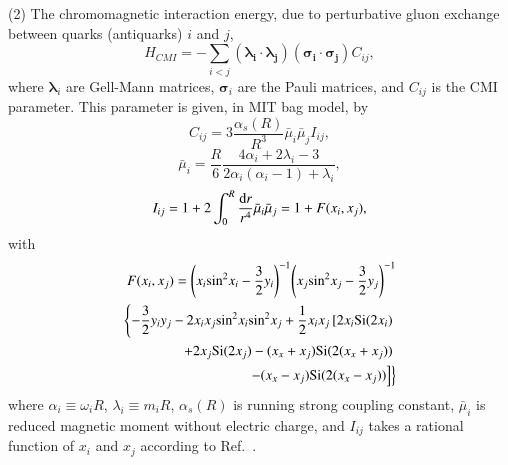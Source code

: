\documentclass[prd,twocolumn,floatfix,nofootinbib]{revtex4}
\begin{document}
(2) The chromomagnetic interaction energy, due to perturbative gluon exchange between quarks (antiquarks) $i$ and $j$,
\begin{equation}\label{CMI}
    H_{CMI}=-\sum_{i<j} \left(\boldsymbol{\lambda_{i}}\cdot \boldsymbol{\lambda_{j}}\right) \left(\boldsymbol{\sigma_{i}}\cdot \boldsymbol{\sigma_{j}}\right)C_{ij},
\end{equation}
where $\boldsymbol{\lambda}_{i}$ are Gell-Mann matrices, $\boldsymbol{\sigma}_{i}$ are the Pauli matrices, and $C_{ij}$ is the CMI parameter. This parameter is given, in MIT bag model, by
\begin{equation}\label{Cij}
    C_{ij}=3\frac{\alpha_{s}\left(R\right)}{R^{3}}\bar{\mu}_{i}\bar{\mu}_{j}I_{ij},
\end{equation}
\begin{equation}\label{muBari}
   \bar{\mu}_{i}=\frac{R}{6} \frac{4\alpha_{i}+2\lambda_{i}-3}{2\alpha_{i}\left(\alpha_{i}-1\right)+\lambda_{i}},
\end{equation}
\begin{equation}\label{Iij}
    I_{ij}=1+2\int_{0}^{R} \frac{{\rm d}r}{r^{4}} \bar{\mu}_{i}\bar{\mu}_{j}=1+F(x_{i}, x_{j}),
\end{equation}
with 
\begin{equation}\label{F}
    \begin{aligned}
        F(x_{i}, x_{j})={\left(x_{i} {\rm sin}^{2}x_{i}-\frac{3}{2}y_{i}\right)}^{-1} {\left(x_{j} {\rm sin^{2}}x_{j}-\frac{3}{2}y_{j}\right)}^{-1} \\ 
        \left\{-\frac{3}{2}y_{i}y_{j}-2x_{i}x_{j} {\rm sin}^{2}x_{i} {\rm sin}^{2}x_{j} +\frac{1}{2}x_{i}x_{j}\left[2x_{i} {\rm Si}(2x_{i}) \right.\right.\\ 
        \left.\left. +2x_{j} {\rm Si}(2x_{j}) -(x_{x}+x_{j}) {\rm Si}(2(x_{x}+x_{j})) \right.\right.\\ 
        \left.\left. -(x_{x}-x_{j}) {\rm Si}(2(x_{x}-x_{j})) \right] \right\}
    \end{aligned}
\end{equation}
where $\alpha_{i}\equiv\omega_{i}R$, $\lambda_{i}\equiv m_{i}R$, $\alpha_{s}\left(R\right)$ is running strong coupling constant, $\bar{\mu}_{i}$ is reduced magnetic moment without electric charge,
and $I_{ij}$ takes a rational function of $x_{i}$ and $x_{j}$ according to Ref.~\cite{DeGrand:1975cf}. 
\end{document}
